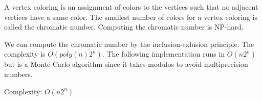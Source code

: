 A vertex coloring is an assignment of colors to the vertices
such that no adjacent vertices have a same color. The smallest
number of colors for a vertex coloring is called the chromatic
number. Computing the chromatic number is NP-hard.

We can compute the chromatic number by the inclusion-exlusion
principle. The complexity is $O(poly(n) 2^n)$. The following
implementation runs in $O(n 2^n)$ but is a Monte-Carlo algorithm 
since it takes modulos to avoid multiprecision numbers. \cite{Bjorklund}

Complexity: $O(n 2^n)$ 

\hrulefill
\begin{multicols}{2}
\inputminted[autogobble,fontsize=\footnotesize]{C++}{Graphs/chromatic.cpp}
\end{multicols}
\hrulefill